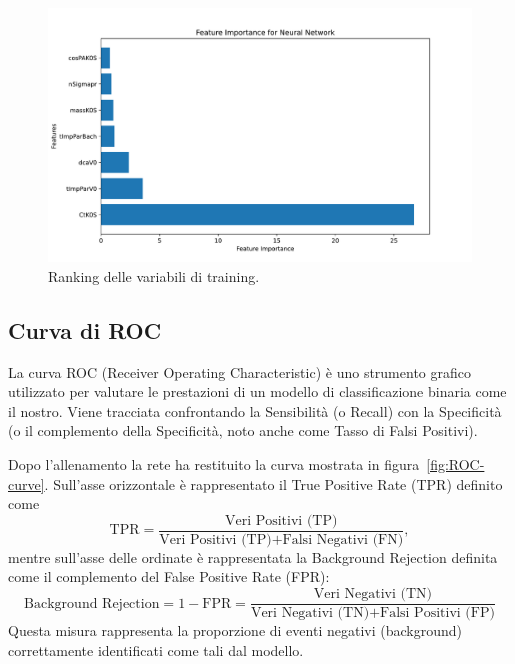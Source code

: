         \begin{figure}[h]
            \centering
            \includegraphics[width=0.8\linewidth]{res/fig/3-chapter/7-feature-importance.pdf}
            \caption{Ranking delle variabili di training.}
            \label{fig:3-7-feature-importance}
        \end{figure}


    \subsection{Curva di ROC}
        La curva ROC (Receiver Operating Characteristic) è uno strumento grafico utilizzato per valutare le prestazioni di un modello di classificazione binaria come il nostro. Viene tracciata confrontando la Sensibilità (o Recall) con la Specificità (o il complemento della Specificità, noto anche come Tasso di Falsi Positivi).

        Dopo l'allenamento la rete ha restituito la curva mostrata in figura~\ref{fig:ROC-curve}. Sull'asse orizzontale è rappresentato il True Positive Rate (TPR) definito come
        \begin{equation}
            \text{TPR} = \frac{\text{Veri\ Positivi (TP)}}{\text{Veri\ Positivi\ (TP)} + \text{Falsi\ Negativi\ (FN)}},
        \end{equation}
        mentre sull'asse delle ordinate è rappresentata la Background Rejection definita come il complemento del False Positive Rate (FPR):
        \begin{equation}
            \text{Background Rejection} = 1 - \text{FPR} = \frac{\text{Veri Negativi (TN)}}{\text{Veri Negativi (TN)} + \text{Falsi Positivi (FP)}}
        \end{equation}
        Questa misura rappresenta la proporzione di eventi negativi (background) correttamente identificati come tali dal modello.

